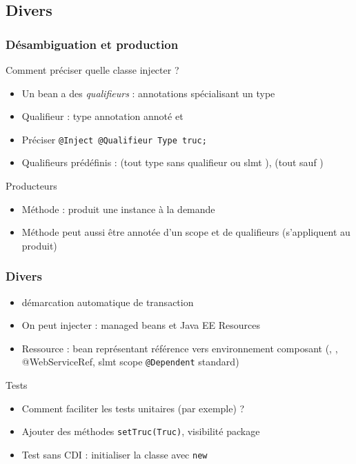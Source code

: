 \documentclass[english, french]{beamer}
\begin{document}
\subsection{Divers}
\begin{frame}
	\frametitle{Désambiguation et production}
	Comment préciser quelle classe injecter ?
	\begin{itemize}
		\item Un bean a des \emph{qualifieurs} : annotations spécialisant un type
		\item Qualifieur : type annotation annoté   et 
		\item Préciser \texttt{@Inject @Qualifieur Type truc;}
		\item {\tiny Qualifieurs prédéfinis :  (tout type sans qualifieur {\tiny ou slmt }),  (tout {\tiny sauf })}
	\end{itemize}
	\begin{block}{Producteurs}
		\begin{itemize}
			\item Méthode  : produit une instance à la demande
			\item Méthode peut aussi être annotée d’un scope et de qualifieurs (s’appliquent au produit)
		\end{itemize}
	\end{block}
\end{frame}

\begin{frame}
	\frametitle{Divers}
	\begin{itemize}
		\item {} démarcation automatique de transaction
		\item On peut injecter : managed beans et Java EE Resources
		\item Ressource : bean représentant référence vers environnement composant (, , {\tiny @WebServiceRef, slmt scope \texttt{@Dependent} standard})
	\end{itemize}
	\begin{block}{Tests}
		\begin{itemize}
			\item Comment faciliter les tests unitaires (par exemple) ? \pause
			\item Ajouter des méthodes \texttt{setTruc(Truc)}, visibilité package
			\item Test sans CDI : initialiser la classe avec \texttt{new}
		\end{itemize}
	\end{block}
\end{frame}
\end{document}
